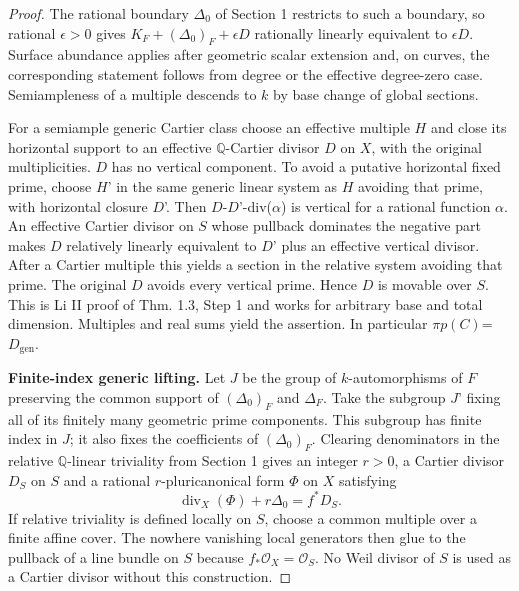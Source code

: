 \documentclass[11pt]{article}
\begin{document}
\begin{proof}
The rational boundary \(\Delta_0\) of Section 1 restricts to such a boundary, so rational
\(\epsilon>0\) gives \(K_F+(\Delta_0)_F+\epsilon D\) rationally linearly equivalent to
\(\epsilon D\). Surface abundance applies after geometric scalar extension and, on curves, the
corresponding statement follows from degree or the effective degree-zero case. Semiampleness of a
multiple descends to \(k\) by base change of global sections.

For a semiample generic Cartier class choose an effective multiple \(H\) and close its horizontal support
to an effective \(\mathbb Q\)-Cartier divisor \(D\) on \(X\), with the original multiplicities. \(D\) has
no vertical component. To avoid a putative horizontal fixed prime, choose \(H\)' in the same generic
linear system as \(H\) avoiding that prime, with horizontal closure \(D\)'. Then
\(D\)-\(D\)'-div(\(\alpha\)) is vertical for a rational function \(\alpha\). An effective Cartier divisor
on \(S\) whose pullback dominates the negative part makes \(D\) relatively linearly equivalent to \(D\)'
plus an effective vertical divisor. After a Cartier multiple this yields a section in the relative system
avoiding that prime. The original \(D\) avoids every vertical prime. Hence \(D\) is movable over \(S\).
This is Li II proof of Thm. 1.3, Step 1 and works for arbitrary base and total dimension. Multiples and
real sums yield the assertion. In particular \(\pi p(C)\)=\(D_{\mathrm{gen}}\).

\textbf{Finite-index generic lifting.} Let \(J\) be the group of \(k\)-automorphisms of \(F\) preserving the common support of \((\Delta_0)_F\) and \(\Delta_F\). Take the subgroup \(J\)' fixing all of its finitely many geometric prime components. This subgroup has finite index in \(J\); it also fixes the coefficients of \((\Delta_0)_F\). Clearing denominators in the relative \(\mathbb Q\)-linear triviality from Section 1 gives an integer \(r>0\), a Cartier divisor \(D_S\) on \(S\) and a rational \(r\)-pluricanonical form \(\Phi\) on \(X\) satisfying \[
 \operatorname{div}_X(\Phi)+r\Delta_0=f^*D_S .
\] If relative triviality is defined locally on \(S\), choose a common multiple over a finite affine cover. The nowhere vanishing local generators then glue to the pullback of a line bundle on \(S\) because \(f_*\mathcal O_X=\mathcal O_S\). No Weil divisor of \(S\) is used as a Cartier divisor without this construction.


\end{proof}
\end{document}
